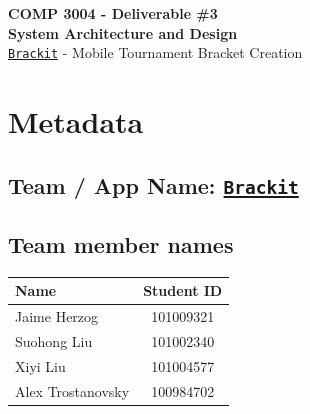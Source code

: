 \documentclass{article}
\begin{document}
\begin{center}


    \LARGE{\textbf{COMP 3004 - Deliverable \#3 \\ System Architecture and Design}}\\ 
    \Large{\href{https://github.com/alextrosta/brackit}{\texttt{Brackit}} - Mobile Tournament Bracket Creation} 
\end{center}


\section*{Metadata}
\subsection*{Team / App Name: \href{https://github.com/alextrosta/brackit}{\texttt{Brackit}}}


\subsection*{Team member names}
\begin{center}
    \begin{tabular}{ |l|c| }
        \hline
        \textbf{Name}     & \textbf{Student ID} \\
        \hline
        Jaime Herzog      & 101009321           \\
        Suohong Liu       & 101002340           \\
        Xiyi Liu          & 101004577           \\
        Alex Trostanovsky & 100984702           \\
        \hline
    \end{tabular}
\end{center}
\tableofcontents
\end{document}
